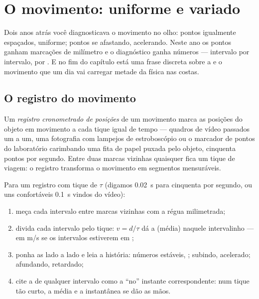 \chapter{O movimento: uniforme e variado}\label{ch:g9:uniform-varied-motion}

Dois anos atrás você diagnosticava o movimento no olho: pontos
igualmente espaçados, uniforme; pontos se afastando, acelerando.
Neste ano os pontos ganham marcações de milímetro e o diagnóstico
ganha números --- intervalo por intervalo,  por .
E no fim do capítulo está uma frase discreta sobre a  e o
movimento que um dia vai carregar metade da física nas costas.

\section{O registro do movimento}

\begin{definition}\label{def:g9:uniform-varied-motion:record}
Um \emph{registro cronometrado de posições} de um movimento marca as posições do objeto
em movimento a cada tique igual de tempo --- quadros de vídeo passados
um a um, uma fotografia com lampejos de estroboscópio ou o marcador
de pontos do laboratório carimbando uma fita de papel puxada pelo
objeto, cinquenta pontos por segundo. Entre duas marcas vizinhas
quaisquer fica um tique de viagem: o registro transforma o movimento
em segmentos mensuráveis.
\end{definition}

\begin{method}\label{met:g9:uniform-varied-motion:read}
Para um registro com tique de  $\tau$ (digamos \qty{0.02}{s}
para cinquenta por segundo, ou uns confortáveis \qty{0.1}{s} vindos
do vídeo):
\begin{enumerate}
  \item meça cada intervalo entre marcas vizinhas com a régua
        milimetrada;
  \item divida cada intervalo pelo tique: $v = d/\tau$ dá a
         (média) naquele intervalinho --- em \unit{m/s} se
        os intervalos estiverem em ;
  \item ponha as  lado a lado e leia a história: números
        estáveis, ; subindo, acelerado; afundando,
        retardado;
  \item cite a  de qualquer intervalo como a 
        ``no'' instante correspondente: num tique tão curto, a média e
        a instantânea se dão as mãos.
\end{enumerate}
\end{method}

